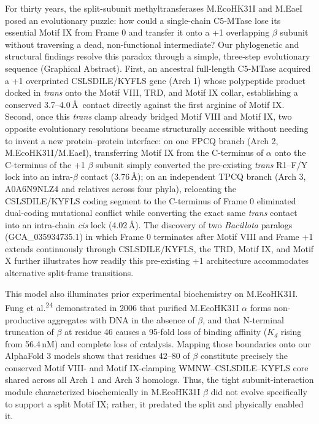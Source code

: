 \documentclass[10pt,letterpaper]{article}
\newcommand{\spname}[1]{\textit{#1}}
\newcommand{\refsup}[1]{\textsuperscript{#1}}
\begin{document}
For thirty years, the split-subunit methyltransferases M.EcoHK31I and M.EaeI posed an evolutionary puzzle: how could a single-chain C5-MTase lose its essential Motif IX from Frame 0 and transfer it onto a +1 overlapping $\beta$ subunit without traversing a dead, non-functional intermediate? Our phylogenetic and structural findings resolve this paradox through a simple, three-step evolutionary sequence (Graphical Abstract). First, an ancestral full-length C5-MTase acquired a +1 overprinted CSLSDILE/KYFLS gene (Arch 1) whose polypeptide product docked in \textit{trans} onto the Motif VIII, TRD, and Motif IX collar, establishing a conserved 3.7--4.0\,\AA\ contact directly against the first arginine of Motif IX. Second, once this \textit{trans} clamp already bridged Motif VIII and Motif IX, two opposite evolutionary resolutions became structurally accessible without needing to invent a new protein--protein interface: on one FPCQ branch (Arch 2, M.EcoHK31I/M.EaeI), transferring Motif IX from the C-terminus of $\alpha$ onto the C-terminus of the +1 $\beta$ subunit simply converted the pre-existing \textit{trans} R1--F/Y lock into an intra-$\beta$ contact (3.76\,\AA); on an independent TPCQ branch (Arch 3, A0A6N9NLZ4 and relatives across four phyla), relocating the CSLSDILE/KYFLS coding segment to the C-terminus of Frame 0 eliminated dual-coding mutational conflict while converting the exact same \textit{trans} contact into an intra-chain \textit{cis} lock (4.02\,\AA). The discovery of two \spname{Bacillota} paralogs (GCA\_035934735.1) in which Frame 0 terminates after Motif VIII and Frame +1 extends continuously through CSLSDILE/KYFLS, the TRD, Motif IX, and Motif X further illustrates how readily this pre-existing +1 architecture accommodates alternative split-frame transitions.

This model also illuminates prior experimental biochemistry on M.EcoHK31I. Fung et al.\refsup{24} demonstrated in 2006 that purified M.EcoHK31I $\alpha$ forms non-productive aggregates with DNA in the absence of $\beta$, and that N-terminal truncation of $\beta$ at residue 46 causes a 95-fold loss of binding affinity ($K_d$ rising from 56.4\,nM) and complete loss of catalysis. Mapping those boundaries onto our AlphaFold 3 models shows that residues 42--80 of $\beta$ constitute precisely the conserved Motif VIII- and Motif IX-clamping WMNW--CSLSDILE--KYFLS core shared across all Arch 1 and Arch 3 homologs. Thus, the tight subunit-interaction module characterized biochemically in M.EcoHK31I $\beta$ did not evolve specifically to support a split Motif IX; rather, it predated the split and physically enabled it.
\end{document}
